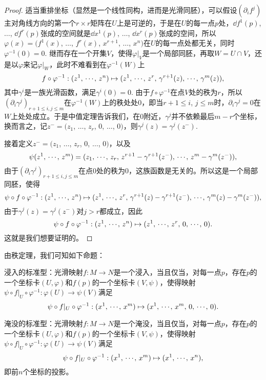 \begin{proof}
	适当重排坐标（显然是一个线性同构，进而是光滑同胚），可以假设$(\partial_i f^j)$主对角线方向的第一个$r\times r$矩阵在$U$上是可逆的，于是在$U$的每一点$p$处，$\dd f^1(p)$, $\dots$, $\dd f^r(p)$张成的空间就是$\dd x^1(p)$, $\dots$, $\dd x^r(p)$张成的空间，所以$\varphi(x)=(f^1(x)$, $\dots$, $f^r(x)$, $x^{r+1}$, $\dots$, $x^n)$在$U$的每一点处都无关，同时$\varphi^{-1}(0)=0$. 继而存在一个开集$V$，使得$\varphi|_V$是一个局部同胚，再取$W=U\cap V$，还是以$\varphi$来记$\varphi|_{W}$，此时不难看到在$\varphi^{-1}(W)$上
	\[
	f\circ \varphi^{-1}:(z^1 ,\,\cdots\hspace{-0.05em},\, z^n)\mapsto (z^1 ,\,\cdots\hspace{-0.05em},\, z^r,\, \gamma^{r+1}(z) ,\,\cdots\hspace{-0.05em},\, \gamma^m(z)),
	\]
	其中$\gamma^i$是一族光滑函数，满足$\gamma^i(0)=0$. 由于$f\circ \varphi^{-1}$在点$V$处的秩为$r$，所以$(\partial_{i}\gamma^j)_{r+1\leq i,j\leq m}$在$\varphi^{-1}(W)$上的秩处处$0$，即当$r+1\leq i$, $j\leq m$时，$\partial_{i}\gamma^j=0$在$W$上处处成立。于是中值定理告诉我们，在$0$附近，$\gamma^j$并不依赖最后$m-r$个坐标，换而言之，记$z^-=(z_1$, $\dots$, $z_r$, $0$, $\dots$, $0)$，则$\gamma^j(z)=\gamma^j(z^-)$.

	接着定义$z^-=(z_1$, $\dots$, $z_r$, $0$, $\dots$, $0)$，以及
	\[
	\psi(z^1 ,\,\cdots\hspace{-0.05em},\,  z^m)=(z_1 ,\,\cdots\hspace{-0.05em},\,  z_r,\,z^{r+1}-\gamma^{r+1}(z^-) ,\,\cdots\hspace{-0.05em},\,  z^{m}-\gamma^{m}(z^-)),
	\]
	由于$(\partial_{i}\gamma^j)_{r+1\leq i,j\leq m}$在点$0$处的秩为$0$，这族函数是无关的。所以这是一个局部同胚，使得
	\[
	\psi\circ f\circ \varphi^{-1}:(z^1 ,\,\cdots\hspace{-0.05em},\, z^n)\mapsto (z^1 ,\,\cdots\hspace{-0.05em},\, z^r,\, \gamma^{r+1}(z)-\gamma^{r+1}(z^-) ,\,\cdots\hspace{-0.05em},\, \gamma^m(z)-\gamma^{m}(z^-)),
	\]
	由于$\gamma^j(z)=\gamma^j(z^-)$对$j>r$都成立，因此
	\[
	\psi\circ f\circ \varphi^{-1}:(z^1 ,\,\cdots\hspace{-0.05em},\, z^n)\mapsto (z^1 ,\,\cdots\hspace{-0.05em},\, z^r,\,0 ,\,\cdots\hspace{-0.05em},\, 0).
	\]
	这就是我们想要证明的。
\end{proof}

由秩定理，我们可知如下命题：
\begin{pro}
\begin{compactenum}[(1)]
\item 浸入的标准型：光滑映射$f:M\to N$是一个浸入，当且仅当，对每一点$p$，存在$p$的一个坐标卡$(U,\varphi)$和$f(p)$的一个坐标卡$(V,\psi)$，使得映射$\psi \circ f|_{U} \circ \varphi^{-1}: \varphi(U)\to \psi(V)$满足
\[
	\psi \circ f|_{U} \circ \varphi^{-1}:(x^1 ,\,\cdots\hspace{-0.05em},\,  x^m)\mapsto (x^1 ,\,\cdots\hspace{-0.05em},\, x^m,\,0 ,\,\cdots\hspace{-0.05em},\, 0).
\]

\item 淹没的标准型：光滑映射$f:M\to N$是一个淹没，当且仅当，对每一点$p$，存在$p$的一个坐标卡$(U,\varphi)$和$f(p)$的一个坐标卡$(V,\psi)$，使得映射$\psi \circ f|_{U} \circ \varphi^{-1}: \varphi(U)\to \psi(V)$满足
\[
	\psi \circ f|_{U} \circ \varphi^{-1}:(x^1,\,\cdots\hspace{-0.05em},\, x^m)\mapsto (x^1,\,\cdots\hspace{-0.05em},\, x^n),
\]
即前$n$个坐标的投影。
\end{compactenum}
\end{pro}

